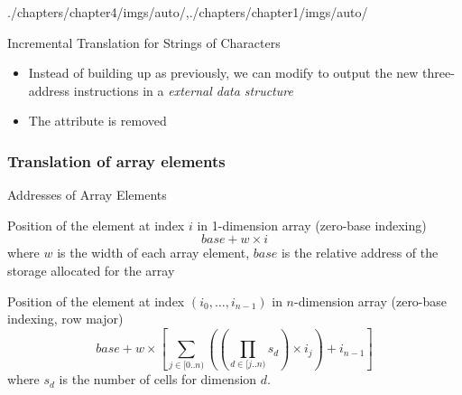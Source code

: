 \begin{graphicspathcontext}{{./chapters/chapter4/imgs/auto/},{./chapters/chapter1/imgs/auto/}}
\begin{bibunit}[apalike]
\begin{frame}{{Incremental Translation} for Strings of Characters}
	\begin{itemize}
	\item Instead of building up  as previously, we can modify  to output the new three-address instructions in a \emph{external data structure}
	\item The  attribute is removed
	\end{itemize}
	\vspace{1cm}
	\begin{footnotesize}
	\begin{sdd}
	\end{sdd}
	\end{footnotesize}
\end{frame}

\subsubsection{Translation of array elements}
\subsubsectiontableofcontentslide

\begin{frame}{Addresses of Array Elements}
	\smaller
	\vspace{.5cm}
	\begin{definitionblock}{Position of the element at index $i$ in 1-dimension array (zero-base indexing)}
		\[ base + w \times i \]
		where $w$ is the width of each array element, $base$ is the relative address of the storage allocated for the array
	\end{definitionblock}
	\begin{definitionblock}{Position of the element at index $(i_0,\dots,i_{n-1})$ in $n$-dimension array (zero-base indexing, row major)}
		\[ base + w \times \left[ \sum_{j\in [0..n)} \left( \left(\prod_{d\in [j..n)}s_d\right) \times i_j \right) + i_{n-1} \right] \]
		where $s_d$ is the number of cells for dimension $d$.
	\end{definitionblock}
\end{frame}


\end{bibunit}
\end{graphicspathcontext}
